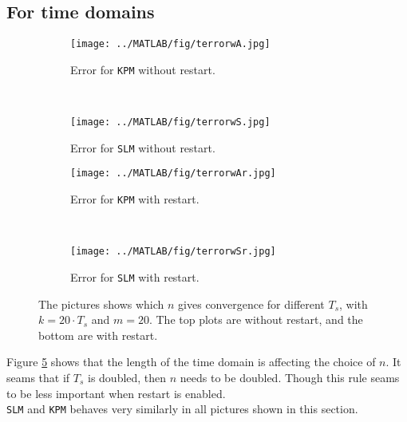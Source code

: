 \subsection{For time domains} %

\begin{figure}[H]
        \centering
        \begin{subfigure}[b]{0.45\textwidth}
                \texttt{[image: ../MATLAB/fig/terrorwA.jpg]}
                \caption{ Error for \texttt{KPM} without restart. }
                \label{fig:terrorwA}
        \end{subfigure}
		~
		\begin{subfigure}[b]{0.45\textwidth}
                \texttt{[image: ../MATLAB/fig/terrorwS.jpg]}
                \caption{ Error for \texttt{SLM} without restart. }
                \label{fig:terrorwS}
        \end{subfigure}
        
        \begin{subfigure}[b]{0.45\textwidth}
                \texttt{[image: ../MATLAB/fig/terrorwAr.jpg]}
                \caption{ Error for \texttt{KPM} with restart. }
                \label{fig:terrorwAr}
        \end{subfigure}
		~
		\begin{subfigure}[b]{0.45\textwidth}
                \texttt{[image: ../MATLAB/fig/terrorwSr.jpg]}
                \caption{ Error for \texttt{SLM} with restart. }
                \label{fig:terrorwSr}
        \end{subfigure}        
        
        \caption{ The pictures shows which $n$ gives convergence for different $T_s$, with $k = 20 \cdot T_s$ and $m = 20$. The top plots are without restart, and the bottom are with restart.}
        \label{fig:rest}
\end{figure}
Figure \ref{fig:rest} shows that the length of the time domain is affecting the choice of $n$. It seams that if $T_s$ is doubled, then $n$ needs to be doubled. Though this rule seams to be less important when restart is enabled. \\
\texttt{SLM} and \texttt{KPM} behaves very similarly in all pictures shown in this section. \\

